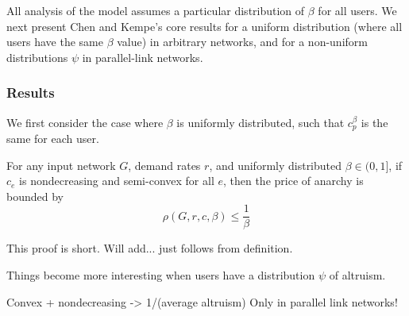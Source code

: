 All analysis of the model assumes a particular distribution of $\beta$ for all users. We next present Chen and Kempe's core results for a uniform distribution (where all users have the same $\beta$ value) in arbitrary networks, and for a non-uniform distributions $\psi$ in parallel-link networks.

\subsubsection{Results}
We first consider the case where $\beta$ is uniformly distributed, such that $c^\beta_p$ is the same for each user.

\begin{theorem}
For any input network $G$, demand rates $r$, and 
uniformly distributed $\beta \in (0, 1]$,
if $c_e$ is nondecreasing and semi-convex for all $e$,
    then the price of anarchy is bounded by 
    $$\rho(G,r,c,\beta) \le \frac{1}{\beta}$$
\end{theorem}

\begin{proof-sketch}
This proof is short. Will add... just follows from definition.
\end{proof-sketch}



Things become more interesting when users have a distribution $\psi$ of altruism.

\begin{theorem}
Convex + nondecreasing -> 1/(average altruism)
Only in parallel link networks!
\end{theorem}

\begin{proof-sketch}
\end{proof-sketch}



